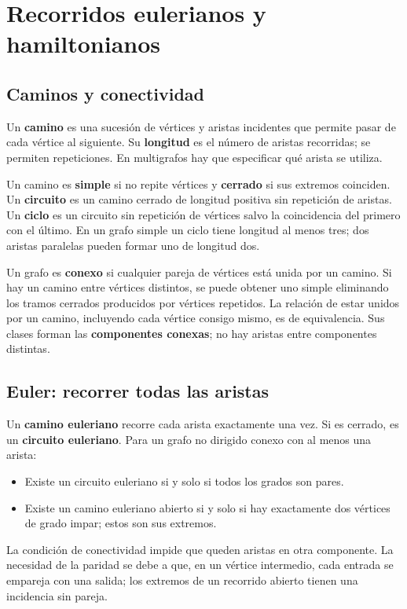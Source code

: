 \chapter{Recorridos eulerianos y hamiltonianos}
\label{md:recorridos}

\section{Caminos y conectividad}
\label{md:caminos}

Un \textbf{camino} es una sucesión de vértices y aristas incidentes
que permite pasar de cada vértice al siguiente.
Su \textbf{longitud} es el número de aristas recorridas; se permiten
repeticiones. En multigrafos hay que especificar qué arista se utiliza.

Un camino es \textbf{simple} si no repite vértices y \textbf{cerrado}
si sus extremos coinciden. Un \textbf{circuito} es un camino cerrado
de longitud positiva sin repetición de aristas. Un \textbf{ciclo}
es un circuito sin repetición de vértices salvo la coincidencia
del primero con el último. En un grafo simple un ciclo tiene longitud
al menos tres; dos aristas paralelas pueden formar uno de longitud dos.

Un grafo es \textbf{conexo} si cualquier pareja de vértices está unida
por un camino. Si hay un camino entre vértices distintos, se puede
obtener uno simple eliminando los tramos cerrados producidos por
vértices repetidos.
La relación de estar unidos por un camino, incluyendo cada vértice
consigo mismo, es de equivalencia. Sus clases forman las
\textbf{componentes conexas}; no hay aristas entre componentes distintas.

\section{Euler: recorrer todas las aristas}
\label{md:euler-grafos}

Un \textbf{camino euleriano} recorre cada arista exactamente una vez.
Si es cerrado, es un \textbf{circuito euleriano}.
Para un grafo no dirigido conexo con al menos una arista:
\begin{itemize}
 \item Existe un circuito euleriano si y solo si todos los grados son pares.
 \item Existe un camino euleriano abierto si y solo si hay exactamente
       dos vértices de grado impar; estos son sus extremos.
\end{itemize}
La condición de conectividad impide que queden aristas en otra componente.
La necesidad de la paridad se debe a que, en un vértice intermedio,
cada entrada se empareja con una salida; los extremos de un recorrido
abierto tienen una incidencia sin pareja.


